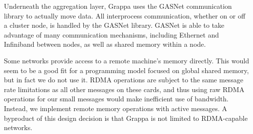 Underneath the aggregation layer, Grappa uses the GASNet communication
library  to actually move data. All interprocess
communication, whether on or off a cluster node, is handled by the
GASNet library. GASNet is able to take advantage of many communication
mechanisms, including Ethernet and Infiniband between nodes, as well as
shared memory within a node.

Some networks provide access to a remote machine's memory
directly. This would seem to be a good fit for a programming model
focused on global shared memory, but in fact we do not use it. RDMA
operations are subject to the same message rate limitations as all
other messages on these cards, and thus using raw RDMA operations for
our small messages would make inefficient use of bandwidth. Instead,
we implement remote memory operations with active messages. A byproduct of this design decision is that Grappa is not limited
to RDMA-capable networks.
